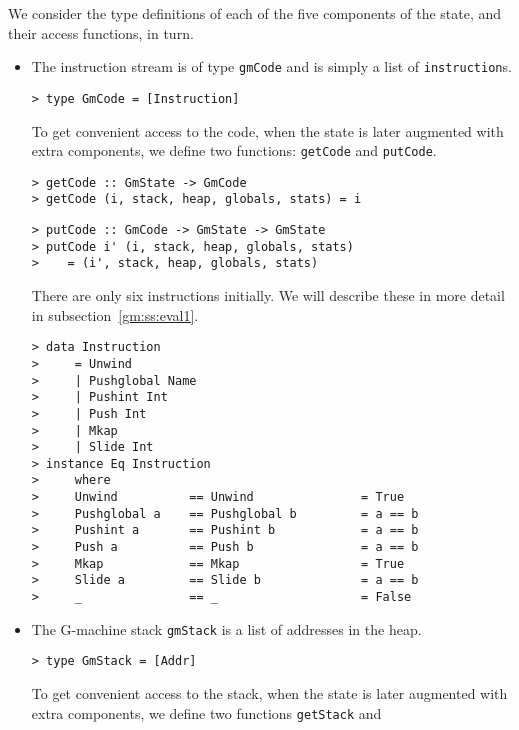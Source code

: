 We consider the type definitions of each of the five components of the
state, and their access functions, in turn.

\begin{itemize}
\item The instruction stream is of type \mbox{\tt gmCode} and is simply a list
of \mbox{\tt instruction}s.
\begin{verbatim}
> type GmCode = [Instruction]
\end{verbatim}
%
To get convenient access to the code, when the state is later
augmented with extra components, we define two functions: \mbox{\tt getCode} and
\mbox{\tt putCode}.
\begin{verbatim}
> getCode :: GmState -> GmCode
> getCode (i, stack, heap, globals, stats) = i
\end{verbatim}
%
%
\begin{verbatim}
> putCode :: GmCode -> GmState -> GmState
> putCode i' (i, stack, heap, globals, stats)
>    = (i', stack, heap, globals, stats)
\end{verbatim}
%
%
\par
There are only six instructions initially. We will describe these in
more detail in subsection~\ref{gm:ss:eval1}.
\begin{verbatim}
> data Instruction 
>     = Unwind
>     | Pushglobal Name
>     | Pushint Int
>     | Push Int
>     | Mkap
>     | Slide Int
> instance Eq Instruction 
>     where
>     Unwind          == Unwind               = True
>     Pushglobal a    == Pushglobal b         = a == b
>     Pushint a       == Pushint b            = a == b
>     Push a          == Push b               = a == b
>     Mkap            == Mkap                 = True
>     Slide a         == Slide b              = a == b
>     _               == _                    = False
\end{verbatim}
%
%
%
%
%
%
%
\item The G-machine stack \mbox{\tt gmStack} is a list of addresses in the heap.
\begin{verbatim}
> type GmStack = [Addr]
\end{verbatim}
%
To get convenient access to the stack, when the state is later
augmented with extra components, we define two functions \mbox{\tt getStack} and

\end{itemize}
